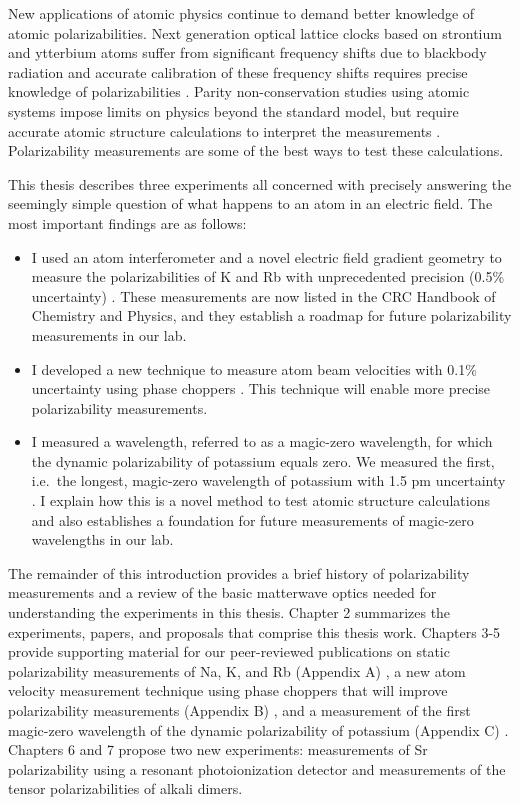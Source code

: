 New applications of atomic physics continue to demand better knowledge of atomic polarizabilities. Next generation optical lattice clocks based on strontium and ytterbium atoms suffer from significant frequency shifts due to blackbody radiation and accurate calibration of these frequency shifts requires precise knowledge of polarizabilities \cite{Lud08,Der11}. Parity non-conservation studies \cite{Woo97,Tsi09} using atomic systems impose limits on physics beyond the standard model, but require accurate atomic structure calculations to interpret the measurements \cite{Der07}. Polarizability measurements are some of the best ways to test these calculations.


This thesis describes three experiments all concerned with precisely answering the seemingly simple question of what happens to an atom in an electric field. The most important findings are as follows:
\begin{itemize}
\item I used an atom interferometer and a novel electric field gradient geometry to measure the polarizabilities of K and Rb with unprecedented precision (0.5\% uncertainty) \cite{Hol10}. These measurements are now listed in the CRC Handbook of Chemistry and Physics, and they establish a roadmap for future polarizability measurements in our lab.
\item I developed a new technique to measure atom beam velocities with 0.1\% uncertainty using phase choppers \cite{Hol11}. This technique will enable more precise polarizability measurements.
\item I measured a wavelength, referred to as a magic-zero wavelength, for which the dynamic polarizability of potassium equals zero. We measured the first, i.e.~the longest, magic-zero wavelength of potassium with 1.5 pm uncertainty \cite{Hol12a}. I explain how this is a novel method to test atomic structure calculations and also establishes a foundation for future measurements of magic-zero wavelengths in our lab.
\end{itemize}



The remainder of this introduction provides a brief history of polarizability measurements and a review of the basic matterwave optics needed for understanding the experiments in this thesis. Chapter 2 summarizes the experiments, papers, and proposals that comprise this thesis work. Chapters 3-5 provide supporting material for our peer-reviewed publications on static polarizability measurements of Na, K, and Rb (Appendix A) \cite{Hol10}, a new atom velocity measurement technique using phase choppers that will improve polarizability measurements (Appendix B) \cite{Hol11}, and a measurement of the first magic-zero wavelength of the dynamic polarizability of potassium (Appendix C) \cite{Hol12a}. Chapters 6 and 7 propose two new experiments: measurements of Sr polarizability using a resonant photoionization detector and measurements of the tensor polarizabilities of alkali dimers.








